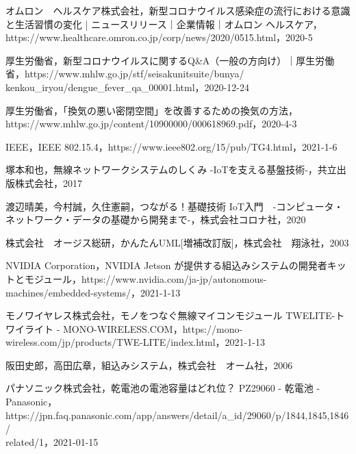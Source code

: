 \begin{thebibliography}{99}

オムロン　ヘルスケア株式会社，新型コロナウイルス感染症の流行における意識と生活習慣の変化 | ニュースリリース｜企業情報｜オムロン ヘルスケア，https://www.healthcare.omron.co.jp/corp/news/2020/0515.html，2020-5

厚生労働省，新型コロナウイルスに関するQ\&A（一般の方向け）｜厚生労働省，https://www.mhlw.go.jp/stf/seisakunitsuite/bunya/\\kenkou\_iryou/dengue\_fever\_qa\_00001.html，2020-12-24

厚生労働省，「換気の悪い密閉空間」を改善するための換気の方法，https://www.mhlw.go.jp/content/10900000/000618969.pdf，2020-4-3

IEEE，IEEE 802.15.4，https://www.ieee802.org/15/pub/TG4.html，2021-1-6

塚本和也，無線ネットワークシステムのしくみ -IoTを支える基盤技術-，共立出版株式会社，2017

渡辺晴美，今村誠，久住憲嗣，つながる！基礎技術 IoT入門　-コンピュータ・ネットワーク・データの基礎から開発まで-，株式会社コロナ社，2020





株式会社　オージス総研，かんたんUML[増補改訂版]，株式会社　翔泳社，2003

NVIDIA Corporation，NVIDIA Jetson が提供する組込みシステムの開発者キットとモジュール，https://www.nvidia.com/ja-jp/autonomous-machines/embedded-systems/，2021-1-13

モノワイヤレス株式会社，モノをつなぐ無線マイコンモジュール TWELITE-トワイライト - MONO-WIRELESS.COM，https://mono-wireless.com/jp/products/TWE-LITE/index.html，2021-1-13

阪田史郎，高田広章，組込みシステム，株式会社　オーム社，2006

パナソニック株式会社， 乾電池の電池容量はどれ位？ PZ29060 - 乾電池 - Panasonic，https://jpn.faq.panasonic.com/app/answers/detail/a\_id/29060/p/1844,1845,1846/\\related/1，2021-01-15


\end{thebibliography}
